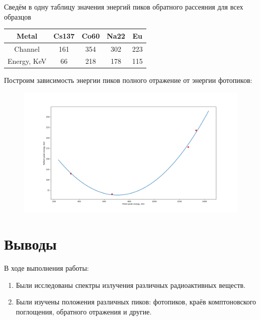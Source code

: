 \documentclass{article}
\begin{document}
Сведём в одну таблицу значения энергий пиков обратного рассеяния для всех образцов
\begin{table}[H]
	\centering
	\begin{tabular}{|c|c|c|c|c|}
		\hline
		Metal       & Cs137& Co60 & Na22 & Eu   \\\hline
		Channel     & 161   & 354  & 302  & 223 \\\hline
		Energy, KeV & 66    & 218  & 178  & 115 \\\hline
	\end{tabular}
\end{table}


Построим зависимость энергии пиков полного отражение от энергии фотопиков:
\begin{figure}[H]
	\includegraphics[width=\textwidth]{photo-reflect.png}
\end{figure}

\section{Выводы}
В ходе выполнения работы:
\begin{enumerate}
	\item Были исследованы спектры излучения различных радиоактивных веществ.
	\item Были изучены положения различных пиков: фотопиков, краёв комптоновского поглощения,
		обратного отражения и другие.
\end{enumerate}
\end{document}
